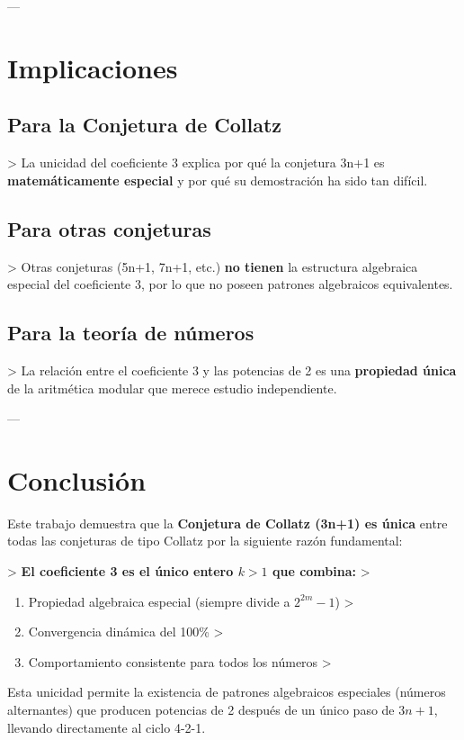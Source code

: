 \documentclass[11pt,a4paper]{article}
\begin{document}
---

\section{Implicaciones}

\subsection{Para la Conjetura de Collatz}
> La unicidad del coeficiente 3 explica por qué la conjetura 3n+1 es \textbf{matemáticamente especial} y por qué su demostración ha sido tan difícil.

\subsection{Para otras conjeturas}
> Otras conjeturas (5n+1, 7n+1, etc.) \textbf{no tienen} la estructura algebraica especial del coeficiente 3, por lo que no poseen patrones algebraicos equivalentes.

\subsection{Para la teoría de números}
> La relación entre el coeficiente 3 y las potencias de 2 es una \textbf{propiedad única} de la aritmética modular que merece estudio independiente.

---

\section{Conclusión}

Este trabajo demuestra que la \textbf{Conjetura de Collatz (3n+1) es única} entre todas las conjeturas de tipo Collatz por la siguiente razón fundamental:

> \textbf{El coeficiente 3 es el único entero \( k > 1 \) que combina:}
> \begin{enumerate}
>     \item Propiedad algebraica especial (siempre divide a \( 2^{2m} - 1 \))
>     \item Convergencia dinámica del 100\%
>     \item Comportamiento consistente para todos los números
> \end{enumerate}

Esta unicidad permite la existencia de patrones algebraicos especiales (números alternantes) que producen potencias de 2 después de un único paso de \( 3n + 1 \), llevando directamente al ciclo 4-2-1.
\end{document}
